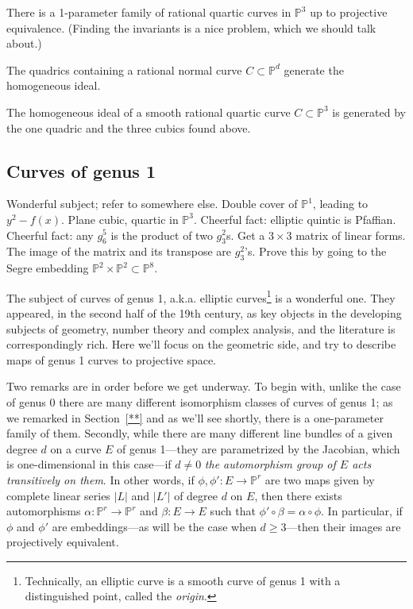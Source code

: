 \documentclass[12pt, leqno]{article}
\def\PP{{\mathbb P}}
\begin{document}
There is a 1-parameter family of rational quartic curves in $\PP^3$ up to projective equivalence. (Finding the invariants is a nice problem, which we should talk about.)

The quadrics containing a rational normal curve $C \subset \PP^d$ generate the homogeneous ideal.

The homogeneous ideal of a smooth rational quartic curve $C \subset \PP^3$ is generated by the one quadric and the three cubics found above.


\subsection{Curves of genus 1}

Wonderful subject; refer to somewhere else. Double cover of $\PP^1$, leading to $y^2 - f(x)$. Plane cubic, quartic in $\PP^3$. Cheerful fact:  elliptic quintic is Pfaffian. Cheerful fact: any $g^5_6$ is the product of two $g^2_3$s. Get a $3\times 3$ matrix of linear forms. The image of the matrix and its transpose are $g^2_3$'s. Prove this by going to the Segre embedding $\PP^2\times \PP^2 \subset\PP^8$.

The subject of curves of genus 1, a.k.a. elliptic curves\footnote{Technically, an elliptic curve is a smooth curve of genus 1 with a distinguished point, called the \emph{origin}.} is a wonderful one. They appeared, in the second half of the 19th century, as key objects in the developing subjects of geometry, number theory and complex analysis, and the literature is correspondingly rich. Here we'll focus on the geometric side, and try to describe maps of genus 1 curves to projective space.

Two remarks are in order before we get underway. To begin with, unlike the case of genus 0 there are many different isomorphism classes of curves of genus 1; as we remarked in Section~\ref{**} and as we'll see shortly, there is a one-parameter family of them. Secondly, while there are many different line bundles of a given degree $d$ on a curve $E$ of genus 1---they are parametrized by the Jacobian, which is one-dimensional in this case---if $d \neq 0$ \emph{the automorphism group of $E$ acts transitively on them}. In other words, if $\phi, \phi' : E \to \PP^r$ are two maps given by complete linear series $|L|$ and $|L'|$ of degree $d$ on $E$, then there exists  automorphisms $\alpha : \PP^r \to \PP^r$ and $\beta : E \to E$ such that $\phi' \circ \beta= \alpha \circ \phi$. In particular, if $\phi$ and $\phi'$ are embeddings---as will be the case when $d \geq 3$---then their images are projectively equivalent.
\end{document}
